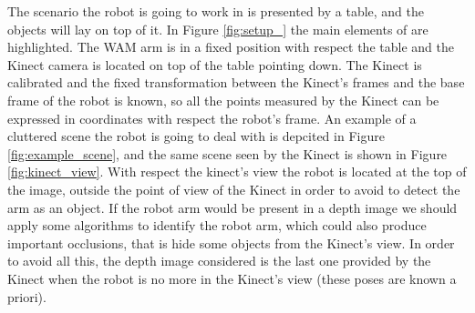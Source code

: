 The scenario the robot is going to work in is presented by a table, and the objects will lay on top of it. In Figure \ref{fig:setup_} the main elements of are highlighted. The WAM arm is in a fixed position with respect the table and the Kinect camera is located on top of the table pointing down. The Kinect is calibrated and the fixed transformation between the Kinect's frames and the base frame of the robot is known, so all the points measured by the Kinect can be expressed in coordinates with respect the robot's frame. An example of a cluttered scene the robot is going to deal with is depcited in Figure \ref{fig:example_scene}, and the same scene seen by the Kinect is shown in Figure \ref{fig:kinect_view}. With respect the kinect's view the robot is located at the top of the image, outside the point of view of the Kinect in order to avoid to detect the arm as an object. If the robot arm would be present in a depth image we should apply some algorithms to identify the robot arm, which could also produce important occlusions, that is hide some objects from the Kinect's view. In order to avoid all this, the depth image considered is the last one provided by the Kinect when the robot is no more in the Kinect's view (these poses are known a priori). 

